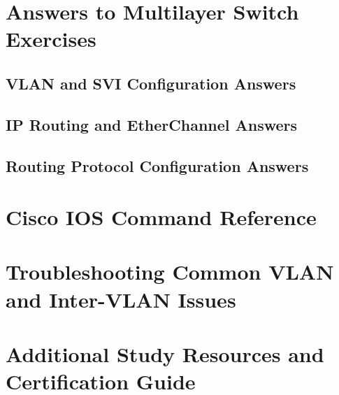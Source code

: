 \documentclass[a4paper]{book}
\begin{document}
\chapter{Answers to Multilayer Switch Exercises}
\section{VLAN and SVI Configuration Answers}
\section{IP Routing and EtherChannel Answers}
\section{Routing Protocol Configuration Answers}

\appendix
\chapter{Cisco IOS Command Reference}
\chapter{Troubleshooting Common VLAN and Inter-VLAN Issues}
\chapter{Additional Study Resources and Certification Guide}
\end{document}
